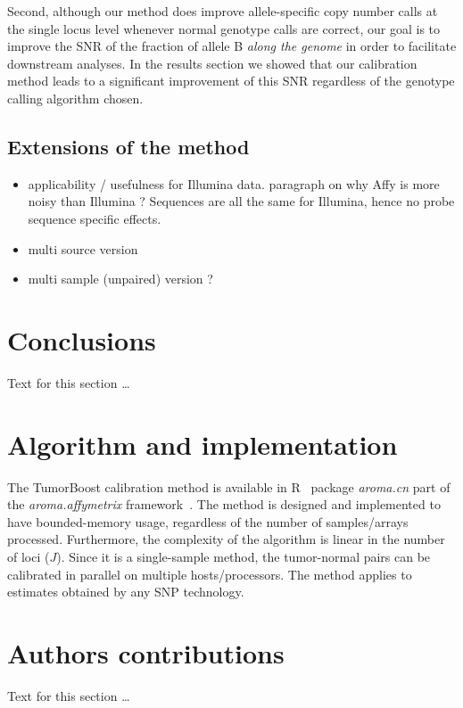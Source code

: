 \documentclass[10pt]{bmc_article}
\newenvironment{bmcformat}{\fussy\setboolean{publ}{true}}{\fussy}
\newcommand{\pkg}[1]{\textit{#1}\xspace}
\begin{document}
\begin{bmcformat}
Second, although our method does improve allele-specific copy number calls at the single locus level whenever normal genotype calls are correct, our goal is to improve the SNR of the fraction of allele B \emph{along the genome} in order to facilitate downstream analyses. In the results section we showed that our calibration method leads to a significant improvement of this SNR regardless of the genotype calling algorithm chosen. 

\subsection*{Extensions of the method}
\begin{itemize}
\item applicability / usefulness for Illumina data. paragraph on why Affy is more noisy than Illumina ? Sequences are all the same for Illumina, hence no probe sequence specific effects.
\item multi source version
\item multi sample (unpaired) version ?
\end{itemize}

    

\section*{Conclusions}
  Text for this section \ldots


\section*{Algorithm and implementation}
The TumorBoost calibration method is available in R~\cite{RDevel_2008} package \pkg{aroma.cn} part of the \pkg{aroma.affymetrix} framework~\cite{BengtssonH_etal_2008b}.  The  method is designed and implemented to have bounded-memory usage, regardless of the number of samples/arrays processed. 
Furthermore, the complexity of the algorithm is linear in the number of loci ($J$).
Since it is a single-sample method, the tumor-normal pairs can be calibrated in parallel on multiple hosts/processors.
The method applies to estimates obtained by any SNP technology.




    
\section*{Authors contributions}
    Text for this section \ldots


\end{bmcformat}
\end{document}
